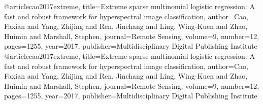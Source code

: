 @article{cao2017extreme,
  title={Extreme sparse multinomial logistic regression: A fast and robust framework for hyperspectral image classification},
  author={Cao, Faxian and Yang, Zhijing and Ren, Jinchang and Ling, Wing-Kuen and Zhao, Huimin and Marshall, Stephen},
  journal={Remote Sensing},
  volume={9},
  number={12},
  pages={1255},
  year={2017},
  publisher={Multidisciplinary Digital Publishing Institute}
}
@article{cao2017extreme,
  title={Extreme sparse multinomial logistic regression: A fast and robust framework for hyperspectral image classification},
  author={Cao, Faxian and Yang, Zhijing and Ren, Jinchang and Ling, Wing-Kuen and Zhao, Huimin and Marshall, Stephen},
  journal={Remote Sensing},
  volume={9},
  number={12},
  pages={1255},
  year={2017},
  publisher={Multidisciplinary Digital Publishing Institute}
}